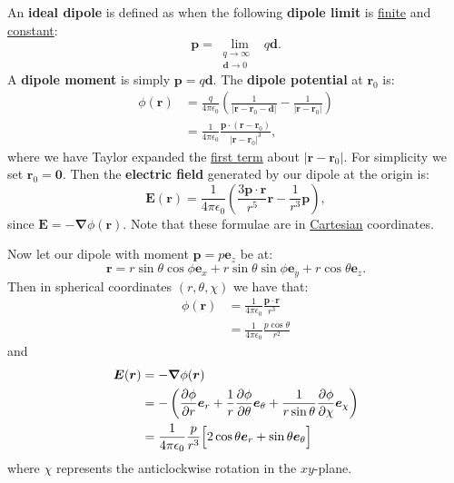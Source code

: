 \documentclass{article}
\begin{document}
An \textbf{ideal dipole} is defined as when the following \textbf{dipole limit} is \underline{finite} and \underline{constant}:
$$\boldsymbol{p}=\lim_{\begin{smallmatrix} q\to\infty & \\ \boldsymbol{d}\to 0 \end{smallmatrix}} q\boldsymbol{d}.$$
A \textbf{dipole moment} is simply $\boldsymbol{p}=q\boldsymbol{d}$. The \textbf{dipole potential} at $\boldsymbol{r}_0$ is:
\begin{align*}
    \phi(\boldsymbol{r})
    &= \frac{q}{4\pi\epsilon_0}\left(\frac{1}{|\boldsymbol{r}-\boldsymbol{r}_0-\boldsymbol{d}|}-\frac{1}{|\boldsymbol{r}-\boldsymbol{r}_0|}\right)\\
    &=\frac{1}{4\pi\epsilon_0}\frac{\boldsymbol{p}\cdot(\boldsymbol{r}-\boldsymbol{r}_0)}{|\boldsymbol{r}-\boldsymbol{r}_0|^3},
\end{align*}
where we have Taylor expanded the \underline{first term} about $|\boldsymbol{r}-\boldsymbol{r}_0|$. For simplicity we set $\boldsymbol{r}_0=\boldsymbol{0}$. Then the \textbf{electric field} generated by our dipole at the origin is:
$$\boldsymbol{E}(\boldsymbol{r})=\frac{1}{4\pi\epsilon_0}\left(\frac{3\boldsymbol{p}\cdot\boldsymbol{r}}{r^5} \boldsymbol{r}-\frac{1}{r^3} \boldsymbol{p}\right),$$
since $\boldsymbol{E}=-\boldsymbol{\nabla}\phi(\boldsymbol{r})$. Note that these formulae are in \underline{Cartesian} coordinates.

Now let our dipole with moment $\boldsymbol{p}
=p\boldsymbol{e}_z$ be at:
$$\boldsymbol{r}=r\sin\theta\cos\phi\boldsymbol{e}_x
+r\sin\theta\sin\phi\boldsymbol{e}_y
+r\cos\theta\boldsymbol{e}_z.$$
Then in spherical coordinates $(r,\theta,\chi)$ we have that:
\begin{align*}
    \phi(\boldsymbol{r})
    &=\frac{1}{4\pi\epsilon_0}\frac{\boldsymbol{p}\cdot\boldsymbol{r}}{r^3} \\
    &=\frac{1}{4\pi\epsilon_0}\frac{p\cos\theta}{r^2}
\end{align*}
and
\begin{align*}
    \boldsymbol{E}(\boldsymbol{r})
    &=-\boldsymbol{\nabla}\phi
    (\boldsymbol{r}) \\
    &=-\left(\frac{\partial\phi}{\partial r}\boldsymbol{e}_r
    +\frac{1}{r}\frac{\partial\phi}{\partial\theta}\boldsymbol{e}_{\theta}
    +\frac{1}{r\sin\theta}\frac{\partial\phi}{\partial\chi}\boldsymbol{e}_{\chi}\right) \\
    &=\frac{1}{4\pi\epsilon_0}\frac{p}{r^3}
    \Bigl[2\cos\theta\boldsymbol{e}_r
    +\sin\theta\boldsymbol{e}_{\theta}\Bigr]
\end{align*}
where $\chi$ represents the anticlockwise rotation
in the $xy$-plane.
\end{document}
